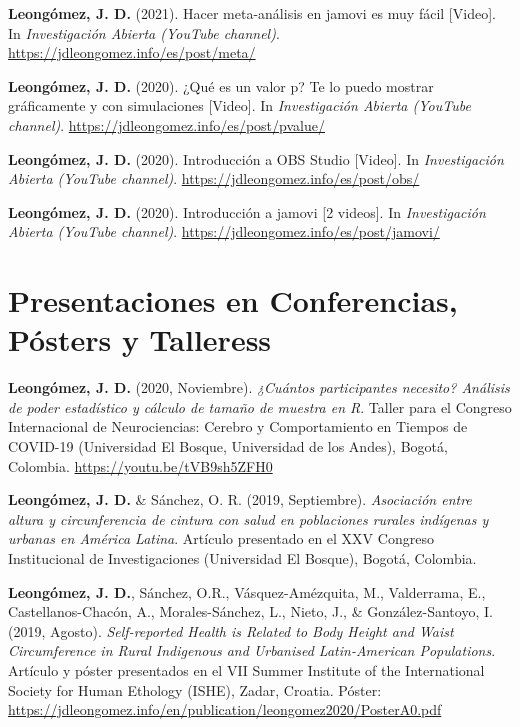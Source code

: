 \documentclass[11pt, a4paper]{awesome-cv}
\begin{document}
\leavevmode\hypertarget{ref-investigacionabiertaHacerMetaanalisisJamovi2021}{}%
\textbf{Leongómez, J. D.} (2021). {Hacer meta-análisis en jamovi es muy
fácil {[}Video{]}}. In \emph{{Investigación Abierta (YouTube channel)}}.
\url{https://jdleongomez.info/es/post/meta/}

\leavevmode\hypertarget{ref-leongomezValorP2020}{}%
\textbf{Leongómez, J. D.} (2020). {¿Qué es un valor p? Te lo puedo
mostrar gráficamente y con simulaciones {[}Video{]}}. In
\emph{{Investigación Abierta (YouTube channel)}}.
\url{https://jdleongomez.info/es/post/pvalue/}

\leavevmode\hypertarget{ref-leongomezIntroduccionOBSStudio2020}{}%
\textbf{Leongómez, J. D.} (2020). {Introducción a OBS Studio
{[}Video{]}}. In \emph{{Investigación Abierta (YouTube channel)}}.
\url{https://jdleongomez.info/es/post/obs/}

\leavevmode\hypertarget{ref-leongomezIntroduccionJamovi2020}{}%
\textbf{Leongómez, J. D.} (2020). {Introducción a jamovi {[}2
videos{]}}. In \emph{{Investigación Abierta (YouTube channel)}}.
\url{https://jdleongomez.info/es/post/jamovi/}

\endgroup

\hypertarget{presentaciones-en-conferencias-puxf3sters-y-talleress}{%
\section{Presentaciones en Conferencias, Pósters y
Talleress}\label{presentaciones-en-conferencias-puxf3sters-y-talleress}}

\begingroup
\setlength{\parindent}{-0.5in}
\setlength{\leftskip}{0.5in}

\textbf{Leongómez, J. D.} (2020, Noviembre). \emph{¿Cuántos
participantes necesito? Análisis de poder estadístico y cálculo de
tamaño de muestra en R}. Taller para el Congreso Internacional de
Neurociencias: Cerebro y Comportamiento en Tiempos de COVID-19
(Universidad El Bosque, Universidad de los Andes), Bogotá, Colombia.
\url{https://youtu.be/tVB9sh5ZFH0}

\textbf{Leongómez, J. D.} \& Sánchez, O. R. (2019, Septiembre).
\emph{Asociación entre altura y circunferencia de cintura con salud en
poblaciones rurales indígenas y urbanas en América Latina}. Artículo
presentado en el XXV Congreso Institucional de Investigaciones
(Universidad El Bosque), Bogotá, Colombia.

\textbf{Leongómez, J. D.}, Sánchez, O.R., Vásquez-Amézquita, M.,
Valderrama, E., Castellanos-Chacón, A., Morales-Sánchez, L., Nieto, J.,
\& González-Santoyo, I. (2019, Agosto). \emph{Self-reported Health is
Related to Body Height and Waist Circumference in Rural Indigenous and
Urbanised Latin-American Populations}. Artículo y póster presentados en
el VII Summer Institute of the International Society for Human Ethology
(ISHE), Zadar, Croatia. Póster:
\url{https://jdleongomez.info/en/publication/leongomez2020/PosterA0.pdf}
\end{document}
